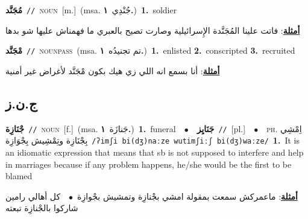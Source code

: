 \documentclass[10pt,a4paper,twoside]{article} %
\begin{document}
\begin{multicols}{2}
{\setlength\topsep{0pt}\textbf{\foreignlanguage{arabic}{مُجَنَّد}}\ {\color{gray}\texttt{//}\color{black}}\ \textsc{noun}\ [m.]\ \color{gray}(msa. \foreignlanguage{arabic}{جُنْدِي}~\foreignlanguage{arabic}{\textbf{١.}})\color{black}\ \textbf{1.}~soldier\  \begin{flushright}\color{gray}\foreignlanguage{arabic}{\textbf{\underline{\foreignlanguage{arabic}{أمثلة}}}: فاتت علينا المُجَنَّدة الإِسرائيلية وصارت تصيح بالعبري ما فهمناش عليها شو بدها}\end{flushright}\color{black}} \vspace{2mm}

{\setlength\topsep{0pt}\textbf{\foreignlanguage{arabic}{مْجَنَّد}}\ {\color{gray}\texttt{//}\color{black}}\ \textsc{noun\textunderscore pass}\ \color{gray}(msa. \foreignlanguage{arabic}{تم تجنيدُه}~\foreignlanguage{arabic}{\textbf{١.}})\color{black}\ \textbf{1.}~enlisted  \textbf{2.}~conscripted  \textbf{3.}~recruited\  \begin{flushright}\color{gray}\foreignlanguage{arabic}{\textbf{\underline{\foreignlanguage{arabic}{أمثلة}}}: أنا بسمع انه اللي زي هيك بكون مْجَنَّد لأغراض غير أمنية}\end{flushright}\color{black}} \vspace{2mm}

\vspace{-3mm}
\subsection*{\color{blue}\foreignlanguage{arabic}{ج.ن.ز}\color{blue}{}} 

{\setlength\topsep{0pt}\textbf{\foreignlanguage{arabic}{جْنَازِة}}\ {\color{gray}\texttt{//}\color{black}}\ \textsc{noun}\ [f.]\ \color{gray}(msa. \foreignlanguage{arabic}{جَنازَة}~\foreignlanguage{arabic}{\textbf{١.}})\color{black}\ \textbf{1.}~funeral\ \ $\bullet$\ \ \setlength\topsep{0pt}\textbf{\foreignlanguage{arabic}{جَنَايِز}}\ {\color{gray}\texttt{//}\color{black}}\ [pl.]\ \ $\bullet$\ \ \textsc{ph.} \color{gray} \foreignlanguage{arabic}{اِمْشِي بِجْنَازِة وتِمْشِيش بِجْوَازِة}\color{black}\ {\color{gray}\texttt{/{\sffamily ʔimʃi bi(dʒ)naːze wutimʃiːʃ bi(dʒ)waːze}/}\color{black}}\ \textbf{1.}~It is an idiomatic expression that means that sb is not supposed to interfere and help in marriages because if any problem happens, he/she would be the first to be blamed\  \begin{flushright}\color{gray}\foreignlanguage{arabic}{\textbf{\underline{\foreignlanguage{arabic}{أمثلة}}}: ماعمركش سمعت بمقولة امشي بجْنازِة وتمشيش بجْوازِة\ $\bullet$\ \  كل أهالي رامين شاركوا بالجْنازِة تبعته}\end{flushright}\color{black}} \vspace{2mm}


\end{multicols}
\end{document}
